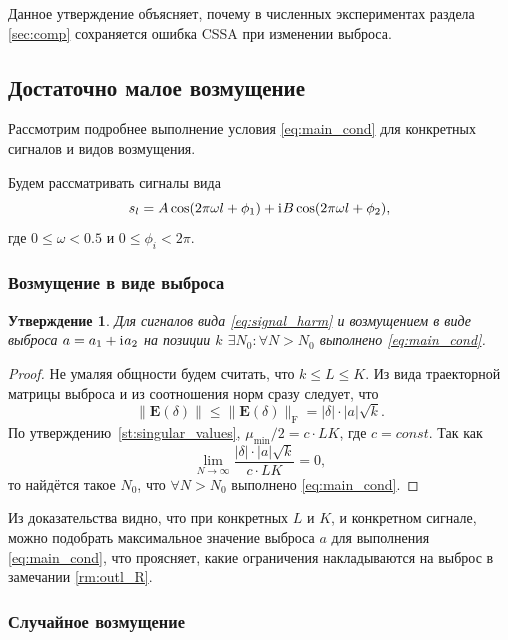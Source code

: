 \documentclass[specialist,
               substylefile = spbu.rtx,
               subf,href,colorlinks=true, 12pt]{disser}
\newtheorem{statement}{Утверждение}
\begin{document}
Данное утверждение объясняет, почему в численных экспериментах раздела \ref{sec:comp} сохраняется ошибка CSSA при изменении выброса.

\subsection{Достаточно малое возмущение}

Рассмотрим подробнее выполнение условия \eqref{eq:main_cond} для конкретных сигналов и видов возмущения.

Будем рассматривать сигналы вида
\begin{equation} \label{eq:signal_harm}
	s_l = A\cos(2 \pi\omega l + \phi_1) + \mathrm{i}\mkern1mu B\cos(2 \pi\omega l + \phi_2),
\end{equation}
где $0 \leq \omega < 0.5$ и $0\le\phi_i < 2\pi$.

\subsubsection{Возмущение в виде выброса}

\begin{statement} \label{st:cond_compl_outlier}
	Для сигналов вида \eqref{eq:signal_harm} и возмущением в виде выброса $a = a_1 + \mathrm{i}\mkern1mu a_2$ на позиции $k$ $\exists N_0 : \forall N > N_0$ выполнено \eqref{eq:main_cond}.
\end{statement}
\begin{proof}
	Не умаляя общности будем считать, что $k \leq L \leq K$.
Из вида траекторной матрицы выброса и из соотношения норм сразу следует, что
	$$\|\mathbf{E}(\delta)\| \leq \|\mathbf{E}(\delta)\|_\mathrm{F} = |\delta|\cdot|a|\sqrt{k}.$$
	По утверждению~\ref{st:singular_values}, $\mu_{\min} / 2 = c\cdot LK$, где $c = const$.
Так как	
	$$\lim_{N \rightarrow \infty} \frac{|\delta|\cdot|a| \sqrt{k}}{c\cdot LK} = 0,$$
то найдётся такое $N_0$, что $\forall N > N_0$ выполнено \eqref{eq:main_cond}.
\end{proof}

Из доказательства видно, что при конкретных $L$ и $K$, и конкретном сигнале, можно подобрать максимальное значение выброса $a$ для выполнения \eqref{eq:main_cond}, что проясняет, какие ограничения накладываются на выброс в замечании \ref{rm:outl_R}.

\subsubsection{Случайное возмущение}
\end{document}
